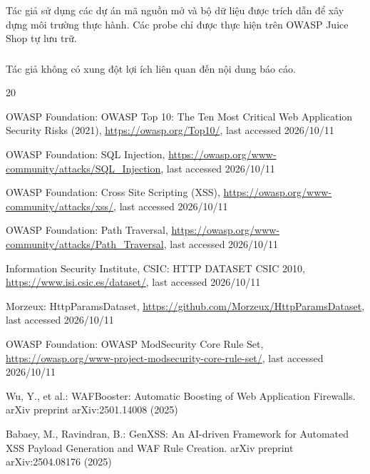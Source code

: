 \documentclass[runningheads]{report-template/llncs}
\begin{document}
\begin{credits}
\subsubsection{\ackname}
Tác giả sử dụng các dự án mã nguồn mở và bộ dữ liệu được trích dẫn để xây
dựng môi trường thực hành. Các probe chỉ được thực hiện trên OWASP Juice
Shop tự lưu trữ.

\subsubsection{\discintname}
Tác giả không có xung đột lợi ích liên quan đến nội dung báo cáo.
\end{credits}

\begin{thebibliography}{20}

OWASP Foundation: OWASP Top 10: The Ten Most Critical Web Application
Security Risks (2021), \url{https://owasp.org/Top10/}, last accessed
2026/10/11

OWASP Foundation: SQL Injection,
\url{https://owasp.org/www-community/attacks/SQL_Injection}, last
accessed 2026/10/11

OWASP Foundation: Cross Site Scripting (XSS),
\url{https://owasp.org/www-community/attacks/xss/}, last accessed
2026/10/11

OWASP Foundation: Path Traversal,
\url{https://owasp.org/www-community/attacks/Path_Traversal}, last
accessed 2026/10/11

Information Security Institute, CSIC: HTTP DATASET CSIC 2010,
\url{https://www.isi.csic.es/dataset/}, last accessed 2026/10/11

Morzeux: HttpParamsDataset,
\url{https://github.com/Morzeux/HttpParamsDataset}, last accessed
2026/10/11

OWASP Foundation: OWASP ModSecurity Core Rule Set,
\url{https://owasp.org/www-project-modsecurity-core-rule-set/}, last
accessed 2026/10/11

Wu, Y., et al.: WAFBooster: Automatic Boosting of Web Application
Firewalls. arXiv preprint arXiv:2501.14008 (2025)

Babaey, M., Ravindran, B.: GenXSS: An AI-driven Framework for Automated
XSS Payload Generation and WAF Rule Creation. arXiv preprint
arXiv:2504.08176 (2025)


\end{thebibliography}
\end{document}
